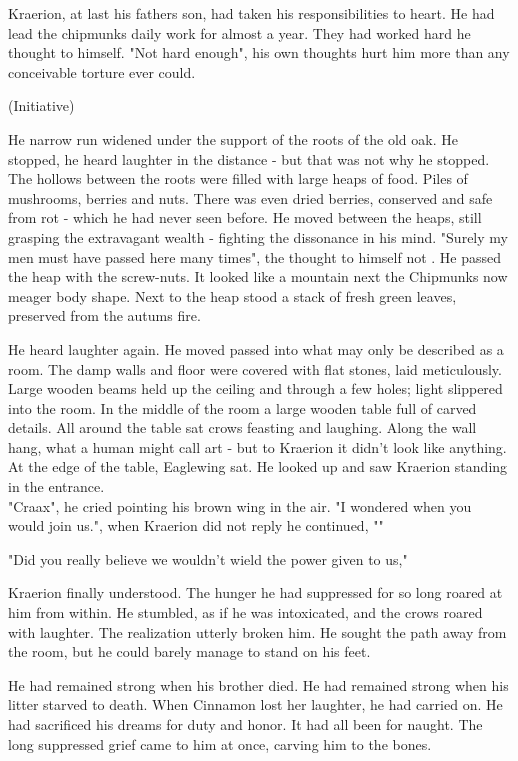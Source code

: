 \documentclass[smalldemyvopaper,11pt,twoside,onecolumn,openright,extrafontsizes]{memoir}
\begin{document}
Kraerion, at last his fathers son, had taken his responsibilities to heart. He had lead the chipmunks daily work for almost a year. They had worked hard he thought to himself. "Not hard enough", his own thoughts hurt him more than any conceivable torture ever could. 

(Initiative)

He narrow run widened under the support of the roots of the old oak. He stopped, he heard laughter in the distance - but that was not why he stopped. The hollows between the roots were filled with large heaps of food. Piles of mushrooms, berries and nuts. There was even dried berries, conserved and safe from rot - which he had never seen before. He moved between the heaps, still grasping the extravagant wealth - fighting the dissonance in his mind. "Surely my men must have passed here many times", the thought to himself not . He passed the heap with the screw-nuts. It looked like a mountain next the Chipmunks now meager body shape. Next to the heap stood a stack of fresh green leaves, preserved from the autums fire.

He heard laughter again. He moved passed into what may only be described as a room. The damp walls and floor were covered with flat stones, laid meticulously. Large wooden beams held up the ceiling and through a few holes; light slippered into the room. In the middle of the room a large wooden table full of carved details. All around the table sat crows feasting and laughing. Along the wall hang, what a human might call art - but to Kraerion it didn't look like anything. At the edge of the table, Eaglewing sat. He looked up and saw Kraerion standing in the entrance.\\

"Craax", he cried pointing his brown wing in the air. "I wondered when you would join us.", when Kraerion did not reply he continued, ""


"Did you really believe we wouldn't wield the power given to us,"

Kraerion finally understood. The hunger he had suppressed for so long roared at him from within. He stumbled, as if he was intoxicated, and the crows roared with laughter. The realization utterly broken him. He sought the path away from the room, but he could barely manage to stand on his feet.

He had remained strong when his brother died. He had remained strong when his litter starved to death. When Cinnamon lost her laughter, he had carried on. He had sacrificed his dreams for duty and honor. It had all been for naught. The long suppressed grief came to him at once, carving him to the bones.
\end{document}
